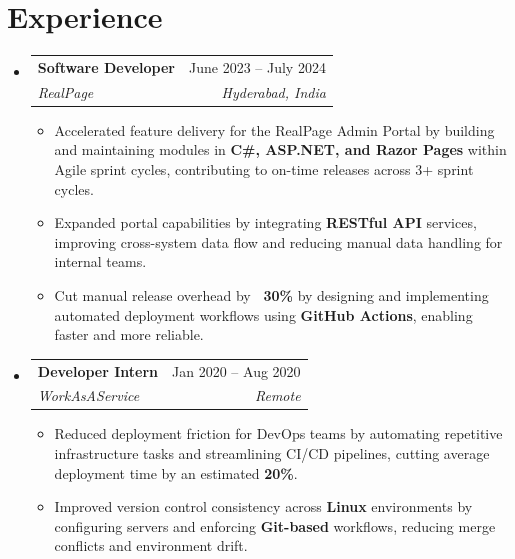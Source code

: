 \documentclass[letterpaper,10pt]{article}
\makeatletter
\newcommand{\resumeItem}[1]{
  \item\small{
    {#1 \vspace{-2pt}}
  }
}
\newcommand{\resumeSubheading}[4]{
  \vspace{-2pt}\item
    \begin{tabular*}{0.97\textwidth}[t]{l@{\extracolsep{\fill}}r}
      \textbf{#1} & #2 \\
      \textit{\small#3} & \textit{\small #4} \\
    \end{tabular*}\vspace{-7pt}
}
\newcommand{\resumeSubHeadingListStart}{\begin{itemize}[leftmargin=0.15in, label={}]}
\newcommand{\resumeSubHeadingListEnd}{\end{itemize}}
\newcommand{\resumeItemListStart}{\begin{itemize}}
\newcommand{\resumeItemListEnd}{\end{itemize}\vspace{-5pt}}
\makeatother
\begin{document}
\section{Experience}
  \resumeSubHeadingListStart

    \resumeSubheading
      {Software Developer}{June 2023 -- July 2024}
      {RealPage}{Hyderabad, India}
      \resumeItemListStart
        \resumeItem{Accelerated feature delivery for the RealPage Admin Portal by building and maintaining modules in \textbf{C\#, ASP.NET, and Razor Pages} within Agile sprint cycles, contributing to on-time releases across 3+ sprint cycles.}
        \resumeItem{Expanded portal capabilities by integrating \textbf{RESTful API} services, improving cross-system data flow and reducing manual data handling for internal teams.}
        \resumeItem{Cut manual release overhead by \textbf{~30\%} by designing and implementing automated deployment workflows using \textbf{GitHub Actions}, enabling faster and more reliable.}
      \resumeItemListEnd

    \resumeSubheading
      {Developer Intern}{Jan 2020 -- Aug 2020}
      {WorkAsAService}{Remote}
      \resumeItemListStart
        \resumeItem{Reduced deployment friction for DevOps teams by automating repetitive infrastructure tasks and streamlining CI/CD pipelines, cutting average deployment time by an estimated \textbf{20\%}.}
        \resumeItem{Improved version control consistency across \textbf{Linux} environments by configuring servers and enforcing \textbf{Git-based} workflows, reducing merge conflicts and environment drift.}
      \resumeItemListEnd

  \resumeSubHeadingListEnd




%
\end{document}
